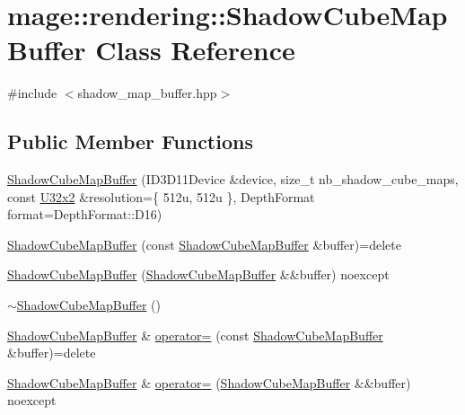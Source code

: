\hypertarget{classmage_1_1rendering_1_1_shadow_cube_map_buffer}{}\section{mage\+:\+:rendering\+:\+:Shadow\+Cube\+Map\+Buffer Class Reference}
\label{classmage_1_1rendering_1_1_shadow_cube_map_buffer}


{\ttfamily \#include $<$shadow\+\_\+map\+\_\+buffer.\+hpp$>$}

\subsection*{Public Member Functions}
\begin{DoxyCompactItemize}
\item 
\mbox{\hyperlink{classmage_1_1rendering_1_1_shadow_cube_map_buffer_aeb1c633be265f8c03dd4e525e069de03}{Shadow\+Cube\+Map\+Buffer}} (I\+D3\+D11\+Device \&device, size\+\_\+t nb\+\_\+shadow\+\_\+cube\+\_\+maps, const \mbox{\hyperlink{namespacemage_a31f2bb52b5080e706e1c13de07c0a249}{U32x2}} \&resolution=\{ 512u, 512u \}, Depth\+Format format=\+Depth\+Format\+::\+D16)
\item 
\mbox{\hyperlink{classmage_1_1rendering_1_1_shadow_cube_map_buffer_a724d0d73588f2e698f2748209befdba8}{Shadow\+Cube\+Map\+Buffer}} (const \mbox{\hyperlink{classmage_1_1rendering_1_1_shadow_cube_map_buffer}{Shadow\+Cube\+Map\+Buffer}} \&buffer)=delete
\item 
\mbox{\hyperlink{classmage_1_1rendering_1_1_shadow_cube_map_buffer_ac636a06f0001b7317ca252b06025ffc4}{Shadow\+Cube\+Map\+Buffer}} (\mbox{\hyperlink{classmage_1_1rendering_1_1_shadow_cube_map_buffer}{Shadow\+Cube\+Map\+Buffer}} \&\&buffer) noexcept
\item 
\mbox{\hyperlink{classmage_1_1rendering_1_1_shadow_cube_map_buffer_a674fdad641a8892821ff8e76d4f05a88}{$\sim$\+Shadow\+Cube\+Map\+Buffer}} ()
\item 
\mbox{\hyperlink{classmage_1_1rendering_1_1_shadow_cube_map_buffer}{Shadow\+Cube\+Map\+Buffer}} \& \mbox{\hyperlink{classmage_1_1rendering_1_1_shadow_cube_map_buffer_a25b59803df1595c97b452dd91c661854}{operator=}} (const \mbox{\hyperlink{classmage_1_1rendering_1_1_shadow_cube_map_buffer}{Shadow\+Cube\+Map\+Buffer}} \&buffer)=delete
\item 
\mbox{\hyperlink{classmage_1_1rendering_1_1_shadow_cube_map_buffer}{Shadow\+Cube\+Map\+Buffer}} \& \mbox{\hyperlink{classmage_1_1rendering_1_1_shadow_cube_map_buffer_a5eb775fdc0f94c220b0115f2695ef18b}{operator=}} (\mbox{\hyperlink{classmage_1_1rendering_1_1_shadow_cube_map_buffer}{Shadow\+Cube\+Map\+Buffer}} \&\&buffer) noexcept

\end{DoxyCompactItemize}
